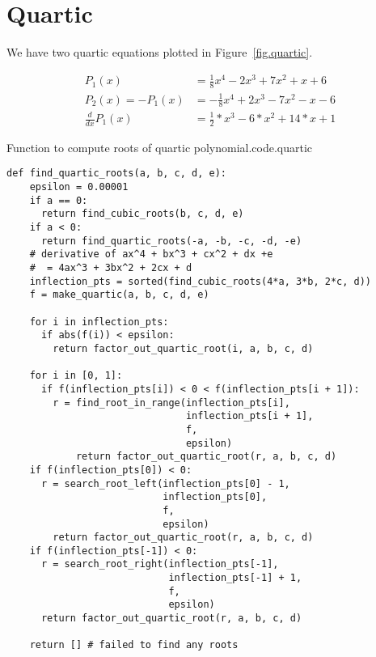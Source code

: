 \section{Quartic}
\label{sec.quartic}



We have two quartic equations plotted in Figure~\ref{fig.quartic}.


\begin{align*}
  P_1(x) &= \frac{1}{8}  x^4 -2 x^3 + 7  x^2 + x + 6\\
  P_2(x) = -P_1(x) &= -\frac{1}{8}  x^4 +2 x^3 - 7  x^2 - x - 6\\
  \frac{d}{dx} P_1(x) &= \frac{1}{2} * x^3 -6* x^2 + 14 * x + 1
\end{align*}


\begin{listing}{Function to compute roots of quartic polynomial.}{code.quartic}
\begin{minipage}[c]{0.98\textwidth}\begin{lstlisting}
def find_quartic_roots(a, b, c, d, e):
    epsilon = 0.00001
    if a == 0:
      return find_cubic_roots(b, c, d, e)
    if a < 0:
      return find_quartic_roots(-a, -b, -c, -d, -e)
    # derivative of ax^4 + bx^3 + cx^2 + dx +e
    #  = 4ax^3 + 3bx^2 + 2cx + d
    inflection_pts = sorted(find_cubic_roots(4*a, 3*b, 2*c, d))
    f = make_quartic(a, b, c, d, e)

    for i in inflection_pts:
      if abs(f(i)) < epsilon:
        return factor_out_quartic_root(i, a, b, c, d)

    for i in [0, 1]:
      if f(inflection_pts[i]) < 0 < f(inflection_pts[i + 1]):
        r = find_root_in_range(inflection_pts[i],
                               inflection_pts[i + 1],
                               f,
                               epsilon)
            return factor_out_quartic_root(r, a, b, c, d)
    if f(inflection_pts[0]) < 0:
      r = search_root_left(inflection_pts[0] - 1, 
                           inflection_pts[0],
                           f,
                           epsilon)
        return factor_out_quartic_root(r, a, b, c, d)
    if f(inflection_pts[-1]) < 0:
      r = search_root_right(inflection_pts[-1],
                            inflection_pts[-1] + 1, 
                            f, 
                            epsilon)
      return factor_out_quartic_root(r, a, b, c, d)

    return [] # failed to find any roots
\end{lstlisting}\end{minipage}\end{listing}
